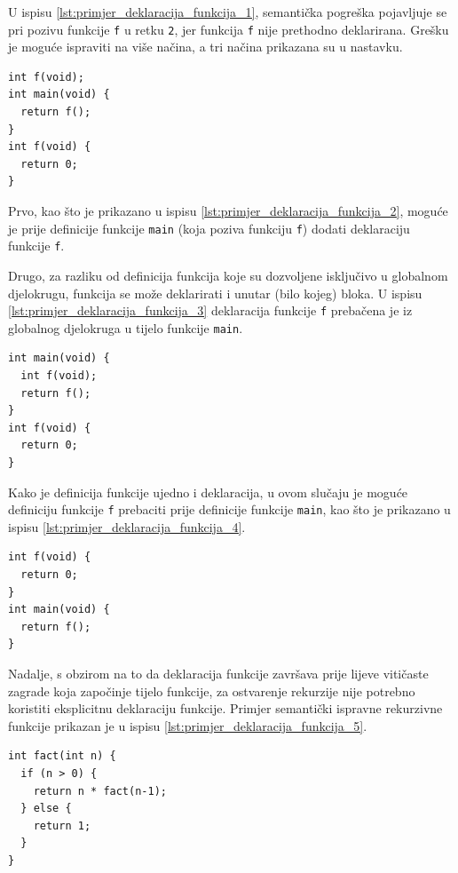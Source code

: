 \documentclass[times, 12pt, utf8]{book}
\begin{document}
U ispisu \ref{lst:primjer_deklaracija_funkcija_1}, semantička pogreška pojavljuje se pri pozivu funkcije \verb|f| u retku \verb|2|, jer funkcija \verb|f| nije prethodno deklarirana.
Grešku je moguće ispraviti na više načina, a tri načina prikazana su u nastavku.

\begin{lstlisting}[caption={Dodatak deklaracije funkcije \texttt{f} prije definicije funkcije \texttt{main}.},label=lst:primjer_deklaracija_funkcija_2]
int f(void);
int main(void) {
  return f();
}
int f(void) {
  return 0;
}
\end{lstlisting}

Prvo, kao što je prikazano u ispisu \ref{lst:primjer_deklaracija_funkcija_2}, moguće je prije definicije funkcije \verb|main| (koja poziva funkciju \verb|f|) dodati deklaraciju funkcije \verb|f|.

Drugo, za razliku od definicija funkcija koje su dozvoljene isključivo u globalnom djelokrugu, funkcija se može deklarirati i unutar (bilo kojeg) bloka.
U ispisu \ref{lst:primjer_deklaracija_funkcija_3} deklaracija funkcije \verb|f| prebačena je iz globalnog djelokruga u tijelo funkcije \verb|main|.

\begin{lstlisting}[caption={Deklaracija funkcije \texttt{f} neposredno prije poziva u tijelu funkcije \texttt{main}.},label=lst:primjer_deklaracija_funkcija_3]
int main(void) {
  int f(void);
  return f();
}
int f(void) {
  return 0;
}
\end{lstlisting}

Kako je definicija funkcije ujedno i deklaracija, u ovom slučaju je moguće definiciju funkcije \verb|f| prebaciti prije definicije funkcije \verb|main|, kao što je prikazano u ispisu \ref{lst:primjer_deklaracija_funkcija_4}.

\begin{lstlisting}[caption={Definicija funkcije \texttt{f} je ujedno i njena deklaracija.},label=lst:primjer_deklaracija_funkcija_4]
int f(void) {
  return 0;
}
int main(void) {
  return f();
}
\end{lstlisting}

Nadalje, s obzirom na to da deklaracija funkcije završava prije lijeve vitičaste zagrade koja započinje tijelo funkcije, za ostvarenje rekurzije nije potrebno koristiti eksplicitnu deklaraciju funkcije.
Primjer semantički ispravne rekurzivne funkcije prikazan je u ispisu \ref{lst:primjer_deklaracija_funkcija_5}.

\begin{lstlisting}[caption={Rekurzivne funkcije ne treba eksplicitno deklarirati prije definicije.},label=lst:primjer_deklaracija_funkcija_5]
int fact(int n) {
  if (n > 0) {
    return n * fact(n-1);
  } else {
    return 1;
  }
}
\end{lstlisting}
\end{document}
